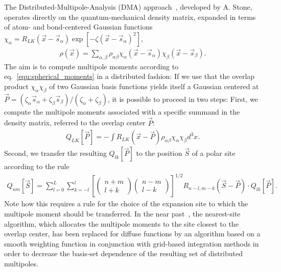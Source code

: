 The Distributed-Multipole-Analysis (DMA) approach~\cite{stone_distributed_1985, stone_distributed_2005}, developed by A. Stone, operates directly on the quantum-mechanical density matrix, expanded in terms of atom- and bond-centered Gaussian functions $\chi_\alpha = R_{LK}(\vec{x}-\vec{s}_\alpha) \exp[-\zeta(\vec{x}-\vec{s}_\alpha)^2]$,
\begin{align}
 \rho(\vec{x}) = \sum_{\alpha,\beta} \rho_{\alpha\beta} \chi_\alpha(\vec{x}-\vec{s}_\alpha) \chi_\beta(\vec{x}-\vec{s}_\beta). 
\end{align}
The aim is to compute multipole moments according to eq.~\ref{equ:spherical_moments} in a distributed fashion: If we use that the overlap product $\chi_\alpha \chi_\beta$ of two Gaussian basis functions yields itself a Gaussian centered at $\vec{P} = (\zeta_\alpha \vec{s}_\alpha + \zeta_\beta \vec{s}_\beta) / (\zeta_\alpha + \zeta_\beta)$, it is possible to proceed in two steps: First, we compute the multipole moments associated with a specific summand in the density matrix, referred to the overlap center $\vec{P}$:
\begin{align}
 Q_{LK}[\vec{P}] = - \int R_{LK}(\vec{x}-\vec{P}) \rho_{\alpha\beta} \chi_\alpha \chi_\beta d^3\!x.
\end{align}
Second, we transfer the resulting $Q_{lk}[\vec{P}]$ to the position $\vec{S}$ of a polar site according to the rule~\cite{stone_distributed_1985}
\begin{align}
 Q_{nm}[\vec{S}] = \sum_{l=0}^L \sum_{k=-l}^l \left[ \left(\begin{array}{c} n+m \\ l+k \end{array}\right)\left(\begin{array}{c} n-m \\ l-k \end{array}\right) \right]^{1/2} R_{n-l,m-k}(\vec{S}-\vec{P})\cdot Q_{lk}[\vec{P}].
\end{align}
Note how this requires a rule for the choice of the expansion site to which the multipole moment should be transferred. In the near past~\cite{stone_distributed_2005}, the nearest-site algorithm, which allocates the multipole moments to the site closest to the overlap center, has been replaced for diffuse functions by an algorithm based on a smooth weighting function in conjunction with grid-based integration methods in order to decrease the basis-set dependence of the resulting set of distributed multipoles.